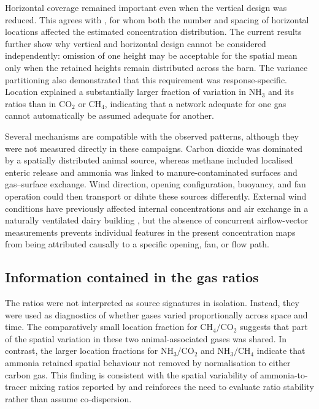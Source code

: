 \documentclass[12pt,a4paper]{article}
\begin{document}
Horizontal coverage remained important even when the vertical design was
reduced. This agrees with \citet{Durso2022}, for whom both the number and
spacing of horizontal locations affected the estimated concentration
distribution. The current results further show why vertical and horizontal
design cannot be considered independently: omission of one height may be
acceptable for the spatial mean only when the retained heights remain
distributed across the barn. The variance partitioning also demonstrated that
this requirement was response-specific. Location explained a substantially
larger fraction of variation in \(\mathrm{NH_3}\) and its ratios than in
\(\mathrm{CO_2}\) or \(\mathrm{CH_4}\), indicating that a network adequate
for one gas cannot automatically be assumed adequate for another.

Several mechanisms are compatible with the observed patterns, although they
were not measured directly in these campaigns. Carbon dioxide was dominated
by a spatially distributed animal source, whereas methane included localised
enteric release and ammonia was linked to manure-contaminated surfaces and
gas--surface exchange. Wind direction, opening configuration, buoyancy, and
fan operation could then transport or dilute these sources differently.
External wind conditions have previously affected internal concentrations and
air exchange in a naturally ventilated dairy building \citep{Saha2013}, but
the absence of concurrent airflow-vector measurements prevents individual
features in the present concentration maps from being attributed causally to
a specific opening, fan, or flow path.

\subsection{Information contained in the gas ratios}

The ratios were not interpreted as source signatures in isolation. Instead,
they were used as diagnostics of whether gases varied proportionally across
space and time. The comparatively small location fraction for
\(\mathrm{CH_4}/\mathrm{CO_2}\) suggests that part of the spatial variation
in these two animal-associated gases was shared. In contrast, the larger
location fractions for \(\mathrm{NH_3}/\mathrm{CO_2}\) and
\(\mathrm{NH_3}/\mathrm{CH_4}\) indicate that ammonia retained spatial
behaviour not removed by normalisation to either carbon gas. This finding is
consistent with the spatial variability of ammonia-to-tracer mixing ratios
reported by \citet{Mendes2015} and reinforces the need to evaluate ratio
stability rather than assume co-dispersion.
\end{document}
